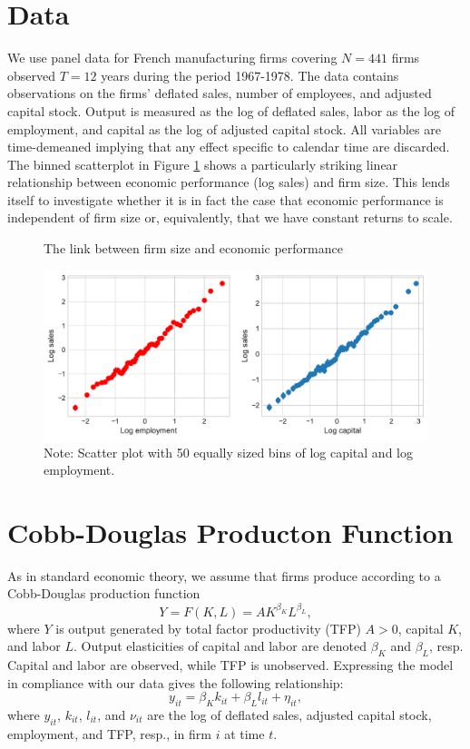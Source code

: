 \documentclass[11pt]{article}
\begin{document}
\section{Data}
We use panel data for French manufacturing firms covering $N=441$ firms observed $T=12$ years during the period 1967-1978. The data contains observations on the firms' deflated sales, number of employees, and adjusted capital stock. Output is measured as the log of deflated sales, labor as the log of employment, and capital as the log of adjusted capital stock. All variables are time-demeaned implying that any effect specific to calendar time are discarded. The binned scatterplot in Figure \ref{fig:fig_bin_plot} shows a particularly striking linear relationship between economic performance (log sales) and firm size. This lends itself to investigate whether it is in fact the case that economic performance is independent of firm size or, equivalently, that we have constant returns to scale. 

\begin{figure}[H]
    \centering
    \caption{The link between firm size and economic performance}
    \label{fig:fig_bin_plot}
    \includegraphics[scale=0.7]{fig1.pdf}
    \caption*{Note: Scatter plot with 50 equally sized bins of log capital and log employment.}
\end{figure}

\section{Cobb-Douglas Producton Function}
As in standard economic theory, we assume that firms produce according to a Cobb-Douglas production function
\begin{equation}
    Y = F(K,L) = AK^{\beta_K}L^{\beta_L}, 
\end{equation}
where $Y$ is output generated by total factor productivity (TFP) $A>0$, capital $K$, and labor $L$. Output elasticities of capital and labor are denoted $\beta_K$ and $\beta_L$, resp. Capital and labor are observed, while TFP is unobserved. Expressing the model in compliance with our data gives the following relationship: 
\begin{equation}
\label{LinearModel}
    y_{it} = \beta_K k_{it} + \beta_L l_{it} + \eta_{it}, 
\end{equation}
where $y_{it}$, $k_{it}$, $l_{it}$, and $\nu_{it}$ are the log of deflated sales, adjusted capital stock, employment, and TFP, resp., in firm $i$ at time $t$. 
\end{document}
